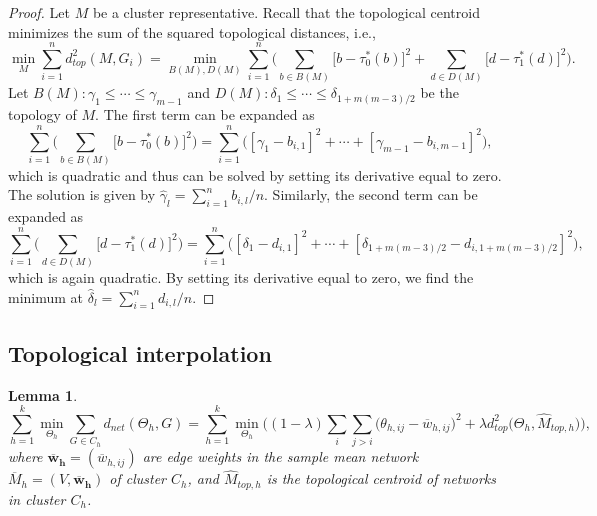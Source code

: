 \documentclass{article} %
\newtheorem{lemma}{Lemma}
\begin{document}
\begin{proof}
Let $M$ be a cluster representative.
 Recall that the topological centroid minimizes the sum of the squared topological distances, i.e.,
$$\min_{M} \sum_{i=1}^n d_{top}^2(M,G_i) = \min_{B(M),D(M)} \sum_{i=1}^n \Big( \sum_{b \in B(M)} \big[ b - \tau_{0}^*(b)\big]^2 + \sum_{d \in D(M)} \big[ d - \tau_{1}^*(d)\big]^2 \Big) .$$
Let $B(M): \gamma_{1} \leq \cdots \leq \gamma_{m-1}$ and $D(M): \delta_{1} \leq \cdots \leq \delta_{1+m(m-3)/2}$ be the topology of $M$. The first term can be expanded as
$$\sum_{i=1}^n \Big( \sum_{b \in B(M)} \big[ b - \tau_{0}^*(b)\big]^2 \Big) = \sum_{i=1}^n \Big( [\gamma_1-b_{i,1}]^2 + \cdots + [\gamma_{m-1}-b_{i,m-1}]^2 \Big),$$
which is quadratic and thus can be solved by setting its derivative equal to zero. The solution is given by $\widehat \gamma_l = \sum_{i=1}^n b_{i,l} / n$. Similarly, the second term can be expanded as
$$\sum_{i=1}^n \Big( \sum_{d \in D(M)} \big[ d - \tau_{1}^*(d)\big]^2 \Big) = \sum_{i=1}^n \Big( [\delta_1-d_{i,1}]^2 + \cdots + [\delta_{1+m(m-3)/2}-d_{i,1+m(m-3)/2}]^2 \Big),$$
which is again quadratic. By setting its derivative equal to zero, we find the minimum at $\widehat \delta_l = \sum_{i=1}^n d_{i,l} / n$.

\end{proof}


\subsection{Topological interpolation}
\begin{lemma}
\label{lem:topinterp}
\begin{equation}
\sum_{h=1}^k \min_{\Theta_h} \sum_{G \in C_h} d_{net}(\Theta_h,G) = \sum_{h=1}^k \min_{\Theta_h} \Big( (1-\lambda)\sum_{i}\sum_{j>i} \big(\theta_{h,ij} - \overline w_{h,ij} \big)^2 + \lambda d_{top}^2\big(\Theta_h, \widehat M_{top,h}\big) \Big), 
\end{equation}
where $\bm{\overline w_h} = (\overline w_{h,ij})$ are edge weights in the sample mean network $\overline M_{h} = (V,\bm{\overline w_h})$ of cluster $C_h$, and $\widehat M_{top,h}$ is the topological centroid of networks in cluster $C_h$. 
\end{lemma}
\end{document}
